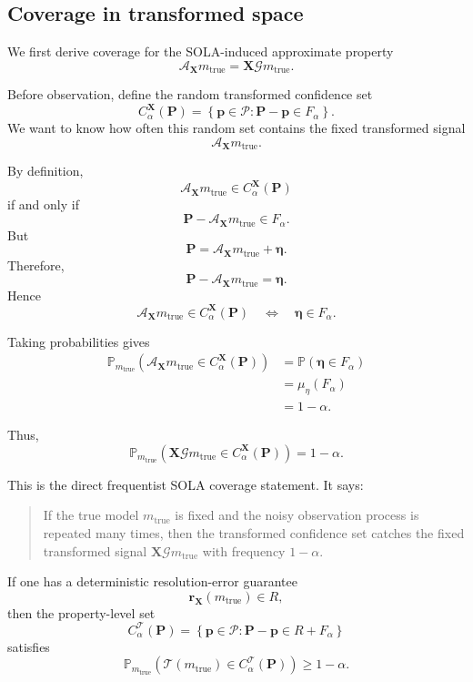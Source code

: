 \documentclass[11pt]{article}
\newcommand{\Pspace}{\mathcal P}
\newcommand{\Prand}{\mathbf P}
\newcommand{\G}{\mathcal G}
\newcommand{\Tau}{\mathcal T}
\newcommand{\X}{\mathbf X}
\newcommand{\A}{\mathcal A}
\newcommand{\Prob}{\mathbb P}
\begin{document}
\subsection{Coverage in transformed space}

We first derive coverage for the SOLA-induced approximate property
\[
    \A_{\X}m_{\mathrm{true}}
    =
    \X\G m_{\mathrm{true}}.
\]

Before observation, define the random transformed confidence set
\[
    C_{\alpha}^{\X}(\Prand)
    =
    \left\{
        \mathbf p\in\Pspace:
        \Prand-\mathbf p\in F_{\alpha}
    \right\}.
\]
We want to know how often this random set contains the fixed transformed signal
\[
    \A_{\X}m_{\mathrm{true}}.
\]

By definition,
\[
    \A_{\X}m_{\mathrm{true}}\in C_{\alpha}^{\X}(\Prand)
\]
if and only if
\[
    \Prand-\A_{\X}m_{\mathrm{true}}\in F_{\alpha}.
\]
But
\[
    \Prand
    =
    \A_{\X}m_{\mathrm{true}}
    +
    \boldsymbol{\eta}.
\]
Therefore,
\[
    \Prand-\A_{\X}m_{\mathrm{true}}
    =
    \boldsymbol{\eta}.
\]
Hence
\[
    \A_{\X}m_{\mathrm{true}}\in C_{\alpha}^{\X}(\Prand)
    \quad
    \Longleftrightarrow
    \quad
    \boldsymbol{\eta}\in F_{\alpha}.
\]

Taking probabilities gives
\[
\begin{aligned}
    \Prob_{m_{\mathrm{true}}}
    \left(
        \A_{\X}m_{\mathrm{true}}
        \in
        C_{\alpha}^{\X}(\Prand)
    \right)
    &=
    \Prob
    \left(
        \boldsymbol{\eta}\in F_{\alpha}
    \right)
    \\
    &=
    \mu_{\eta}(F_{\alpha})
    \\
    &=
    1-\alpha.
\end{aligned}
\]

Thus,
\[
    \Prob_{m_{\mathrm{true}}}
    \left(
        \X\G m_{\mathrm{true}}
        \in
        C_{\alpha}^{\X}(\Prand)
    \right)
    =
    1-\alpha.
\]

This is the direct frequentist SOLA coverage statement. It says:
\begin{quote}
    If the true model \(m_{\mathrm{true}}\) is fixed and the noisy observation process is repeated many times, then the transformed confidence set catches the fixed transformed signal \(\X\G m_{\mathrm{true}}\) with frequency \(1-\alpha\).
\end{quote}

If one has a deterministic resolution-error guarantee
\[
    \mathbf r_{\X}(m_{\mathrm{true}})\in R,
\]
then the property-level set
\[
    C_{\alpha}^{\Tau}(\Prand)
    =
    \left\{
        \mathbf p\in\Pspace:
        \Prand-\mathbf p\in R+F_{\alpha}
    \right\}
\]
satisfies
\[
    \Prob_{m_{\mathrm{true}}}
    \left(
        \Tau(m_{\mathrm{true}})
        \in
        C_{\alpha}^{\Tau}(\Prand)
    \right)
    \geq
    1-\alpha.
\]
\end{document}
